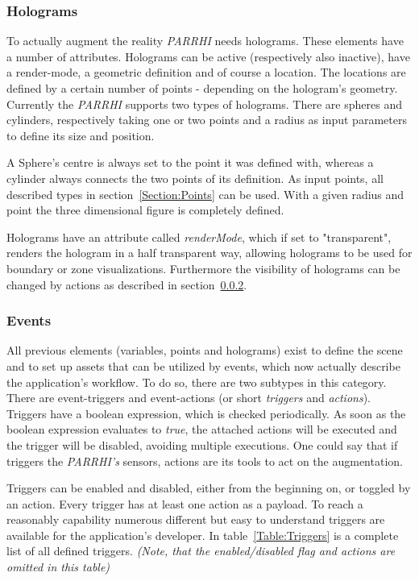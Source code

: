 \subsubsection{Holograms}\label{Section:Holograms}
To actually augment the reality \textit{PARRHI} needs holograms. These elements have a number of attributes. Holograms can be active (respectively also inactive), have a render-mode, a geometric definition and of course a location. The locations are defined by a certain number of points - depending on the hologram's geometry. Currently the \textit{PARRHI} supports two types of holograms. There are spheres and cylinders, respectively taking one or two points and a radius as input parameters to define its size and position.

A Sphere's centre is always set to the point it was defined with, whereas a cylinder always connects the two points of its definition. As input points, all described types in section~\ref{Section:Points} can be used. With a given radius and point the three dimensional figure is completely defined.

Holograms have an attribute called \textit{renderMode}, which if set to "transparent", renders the hologram in a half transparent way, allowing holograms to be used for boundary or zone visualizations. Furthermore the visibility of holograms can be changed by actions as described in section~\ref{Section:Events}.

\subsubsection{Events}\label{Section:Events}
All previous elements (variables, points and holograms) exist to define the scene and to set up assets that can be utilized by events, which now actually describe the application's workflow. To do so, there are two subtypes in this category. There are event-triggers and event-actions (or short \textit{triggers} and \textit{actions}). Triggers have a boolean expression, which is checked periodically. As soon as the boolean expression evaluates to \textit{true}, the attached actions will be executed and the trigger will be disabled, avoiding multiple executions. One could say that if triggers the \textit{PARRHI's} sensors, actions are its tools to act on the augmentation. 

Triggers can be enabled and disabled, either from the beginning on, or toggled by an action. Every trigger has at least one action as a payload. To reach a reasonably capability numerous different but easy to understand triggers are available for the application's developer. In table~\ref{Table:Triggers} is a complete list of all defined triggers. \textit{(Note, that the enabled/disabled flag and actions are omitted in this table)}


